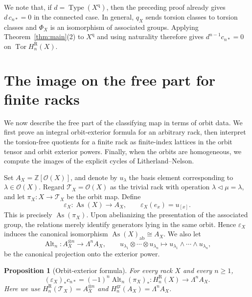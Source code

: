 \documentclass[10pt,a4paper]{amsart}
\newtheorem{proposition}[theorem]{Proposition}
\DeclareMathOperator{\As}{As}
\DeclareMathOperator{\Tor}{Tor}
\DeclareMathOperator{\Type}{Type}
\newcommand{\ZZ}{\mathbb Z}
\newcommand{\OO}{\mathcal O}
\newcommand{\gr}{\mathrm{gr}}
\newcommand{\R}{\mathrm R}
\newcommand{\ab}{\mathrm{ab}}
\begin{document}
We note that, if $d=\Type(X^{\mathrm q})$, then the preceding proof already gives $d\,c_{n*}=0$ in the connected case. In general, $q_X$ sends torsion classes to torsion classes and $\Phi_X$ is an isomorphism of associated groups. Applying Theorem~\ref{thm:main}(2) to $X^{\mathrm q}$ and using
naturality therefore gives $d^{n-1}c_{n*}=0$ on $\Tor H_n^\R(X)$.


\section{The image on the free part for finite racks}
\label{sec:free-part-image}

We now describe the free part of the classifying map in terms of orbit data.
We first prove an integral orbit-exterior formula for an arbitrary rack, then
interpret the torsion-free quotients for a finite rack as finite-index
lattices in the orbit tensor and orbit exterior powers. Finally, when the
orbits are homogeneous, we compute the images of the explicit cycles of
Litherland--Nelson.

Set $A_X=\ZZ[\OO(X)]$, and denote by $u_\lambda$ the basis element
corresponding to $\lambda\in\OO(X)$. Regard
$\mathcal T_X=\OO(X)$ as the trivial rack with operation
$\lambda\lhd\mu=\lambda$, and let
$\pi_X\colon X\to\mathcal T_X$ be the orbit map. Define
\[
\varepsilon_X\colon\As(X)\longrightarrow A_X,
 \qquad
 \varepsilon_X(e_x)=u_{[x]}.
\]
This is precisely $\As(\pi_X)$. Upon abelianizing the presentation of the
associated group, the relations merely identify generators lying in the same
orbit. Hence $\varepsilon_X$ induces the canonical isomorphism
$\As(X)_{\ab}\cong A_X$. We also let
\[
 \operatorname{Alt}_n\colon A_X^{\otimes n}\longrightarrow\Lambda^nA_X,
 \qquad
 u_{\lambda_1}\otimes\cdots\otimes u_{\lambda_n}
 \longmapsto
 u_{\lambda_1}\wedge\cdots\wedge u_{\lambda_n},
\]
be the canonical projection onto the exterior power.

\begin{proposition}[Orbit-exterior formula]
\label{prop:orbit-exterior-formula}
For every rack $X$ and every $n\ge1$,
\begin{equation}
 (\varepsilon_X)_*c_{n*}
 =(-1)^n\operatorname{Alt}_n(\pi_X)_*
 \colon H_n^\R(X)\longrightarrow\Lambda^nA_X.
 \label{eq:orbit-exterior-formula}
\end{equation}
Here we use
$H_n^\R(\mathcal T_X)=A_X^{\otimes n}$ and
$H_n^{\gr}(A_X)=\Lambda^nA_X$.
\end{proposition}
\end{document}
